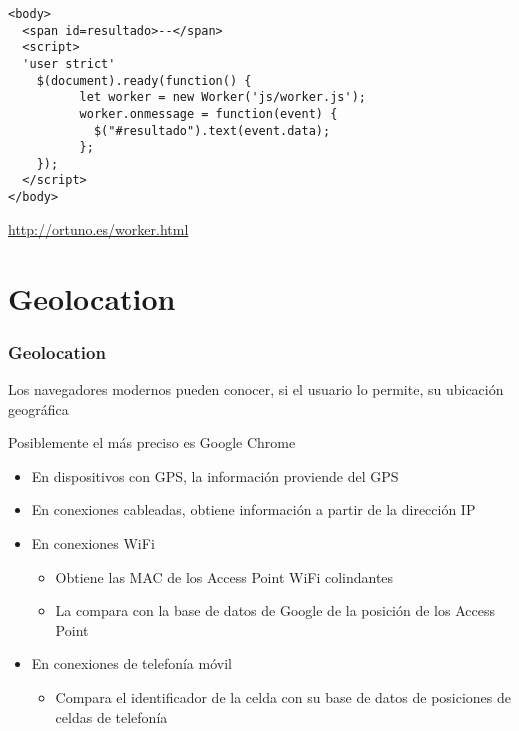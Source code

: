 \documentclass[ucs]{beamer}
\begin{document}
\begin{frame}[fragile]
\frametitle{}

  \begin{scriptsize}
  \begin{verbatim}
<body>
  <span id=resultado>--</span>
  <script>
  'user strict'
    $(document).ready(function() {
          let worker = new Worker('js/worker.js');
          worker.onmessage = function(event) {
            $("#resultado").text(event.data);
          };
    });
  </script>
</body>
  \end{verbatim}
  \end{scriptsize}

\begin{tiny}
\begin{flushright}
\url{http://ortuno.es/worker.html}
\end{flushright}
\end{tiny}
\end{frame}




\section{Geolocation}
\begin{frame}[fragile]
\frametitle{Geolocation}
Los navegadores modernos pueden conocer, si el usuario lo permite,
su ubicación geográfica

Posiblemente el más preciso es Google Chrome
\begin{itemize}
\item
En dispositivos con GPS, la información proviende del GPS

\item
En conexiones cableadas, obtiene información a partir de la dirección IP

\item
En conexiones WiFi

    \begin{itemize}
    \item
Obtiene las MAC de los Access Point WiFi colindantes
    \item
La compara con la base de datos de Google de la posición de los Access Point
    \end{itemize}

\item
En conexiones de telefonía móvil
    \begin{itemize}
    \item
Compara el identificador de la celda con su base de datos de posiciones
de celdas de telefonía
    \end{itemize}

\end{itemize}

\end{frame}
\end{document}

